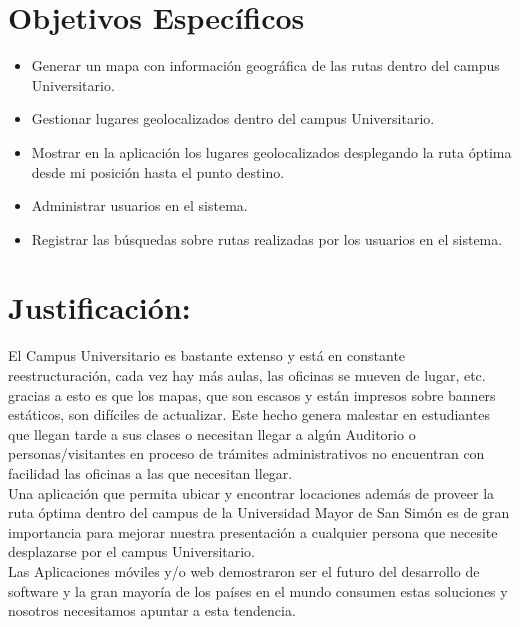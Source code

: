   \section{Objetivos Específicos} %
  \label{sec:obj_especificos}
    \begin{itemize}
      \item Generar un mapa con información geográfica de las rutas dentro del campus Universitario.
      \item Gestionar lugares geolocalizados dentro del campus Universitario.
      \item Mostrar en la aplicación los lugares geolocalizados desplegando la ruta óptima desde mi posición hasta el punto destino.
      \item Administrar usuarios en el sistema.
      \item Registrar las búsquedas sobre rutas realizadas por los usuarios en el sistema.
    \end{itemize}


  \section{Justificación:} %
  \label{sec:justificacion}
  El Campus Universitario es bastante extenso y está en constante reestructuración, cada vez hay más aulas, las oficinas se mueven de lugar, etc. gracias a esto es que los mapas, que son escasos y están impresos sobre banners estáticos, son difíciles de actualizar. Este hecho genera malestar en estudiantes que llegan tarde a sus clases o necesitan llegar a algún Auditorio o personas/visitantes en proceso de trámites administrativos no encuentran con facilidad las oficinas a las que necesitan llegar.\\


  Una aplicación que permita ubicar y encontrar locaciones además de proveer la ruta óptima dentro del campus de la Universidad Mayor de San Simón es de gran importancia para mejorar nuestra presentación a cualquier persona que necesite desplazarse por el campus Universitario.\\


  Las Aplicaciones móviles y/o web demostraron ser el futuro del desarrollo de software y la gran mayoría de los países en el mundo consumen estas soluciones y nosotros necesitamos apuntar a esta tendencia.\\



